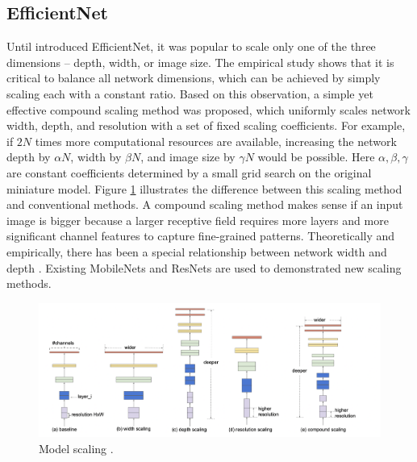 \documentclass[
]{krantz}
\begin{document}
\hypertarget{efficientnet}{%
\subsection{EfficientNet}\label{efficientnet}}

Until \citet{efficient} introduced EfficientNet, it was popular to scale only one of the three dimensions -- depth, width, or image size. The empirical study shows that it is critical to balance all network dimensions, which can be achieved by simply scaling each with a constant ratio. Based on this observation, a simple yet effective compound scaling method was proposed, which uniformly scales network width, depth, and resolution with a set of fixed scaling coefficients. For example, if \(2N\) times more computational resources are available, increasing the network depth by \(\alpha N\), width by \(\beta N\), and image size by \(\gamma N\) would be possible. Here \(\alpha,\beta,\gamma\) are constant coefficients determined by a small grid search on the original miniature model. Figure \ref{fig:ch01-figure03} illustrates the difference between this scaling method and conventional methods. A compound scaling method makes sense if an input image is bigger because a larger receptive field requires more layers and more significant channel features to capture fine-grained patterns. Theoretically and empirically, there has been a special relationship between network width and depth \citep{depthwidth}. Existing MobileNets \citep{mobilenet} and ResNets are used to demonstrated new scaling methods.

\begin{figure}

{\centering \includegraphics[width=1\linewidth]{./figures/01-chapter1/Model_scaling} 

}

\caption{Model scaling \citep{effecient}.}\label{fig:ch01-figure03}
\end{figure}
\end{document}
